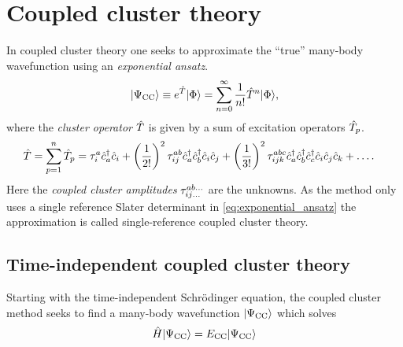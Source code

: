 \chapter{Coupled cluster theory}
    In coupled cluster theory one seeks to approximate the ``true'' many-body
    wavefunction using an \emph{exponential ansatz}.
    \begin{align}
        | \Psi_{\text{CC}} \rangle \equiv e^{\hat{T}}| \Phi \rangle
        = \sum_{n = 0}^{\infty}\frac{1}{n!}\hat{T}^n| \Phi \rangle,
        \label{eq:exponential_ansatz}
    \end{align}
    where the \emph{cluster operator} $\hat{T}$ is given by a sum of excitation
    operators $\hat{T}_{p}$.
    \begin{align}
        \hat{T} &= \sum_{p = 1}^{n} \hat{T}_p
        = \tau^a_i\hat{c}_{a}^{\dagger}\hat{c}_{i}
        + \left( \frac{1}{2!} \right)^2\tau^{ab}_{ij}\hat{c}_{a}^{\dagger}\hat{c}_{b}^{\dagger}\hat{c}_{i}\hat{c}_{j}
        + \left( \frac{1}{3!} \right)^2\tau^{abc}_{ijk}
        \hat{c}_{a}^{\dagger}\hat{c}_{b}^{\dagger}\hat{c}_{c}^{\dagger}\hat{c}_{i}\hat{c}_{j}\hat{c}_{k}
        + \dots.
    \end{align}
    Here the \emph{coupled cluster amplitudes} $\tau^{ab\dots}_{ij\dots}$
    are the unknowns. As the method only uses a single reference Slater
    determinant in \autoref{eq:exponential_ansatz} the approximation is called
    single-reference coupled cluster theory.


    \section{Time-independent coupled cluster theory}
        Starting with the time-independent Schrödinger equation, the coupled
        cluster method seeks to find a many-body wavefunction $| \Psi_{\text{CC}} \rangle$ which
        solves
        \begin{align}
            \hat{H}| \Psi_{\text{CC}} \rangle = E_{\text{CC}}| \Psi_{\text{CC}} \rangle
        \end{align}
